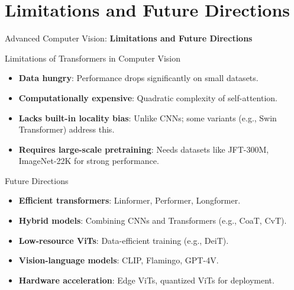 \section{Limitations and Future Directions}
\begin{frame}{}
    \LARGE Advanced Computer Vision: \textbf{Limitations and Future Directions}
\end{frame}

\begin{frame}{Limitations of Transformers in Computer Vision}
    \begin{itemize}
        \item \textbf{Data hungry}: Performance drops significantly on small datasets.
        \item \textbf{Computationally expensive}: Quadratic complexity of self-attention.
        \item \textbf{Lacks built-in locality bias}: Unlike CNNs; some variants (e.g., Swin Transformer) address this.
        \item \textbf{Requires large-scale pretraining}: Needs datasets like JFT-300M, ImageNet-22K for strong performance.
    \end{itemize}
\end{frame}

\begin{frame}{Future Directions}
    \begin{itemize}
        \item \textbf{Efficient transformers}: Linformer, Performer, Longformer.
        \item \textbf{Hybrid models}: Combining CNNs and Transformers (e.g., CoaT, CvT).
        \item \textbf{Low-resource ViTs}: Data-efficient training (e.g., DeiT).
        \item \textbf{Vision-language models}: CLIP, Flamingo, GPT-4V.
        \item \textbf{Hardware acceleration}: Edge ViTs, quantized ViTs for deployment.
    \end{itemize}
\end{frame}